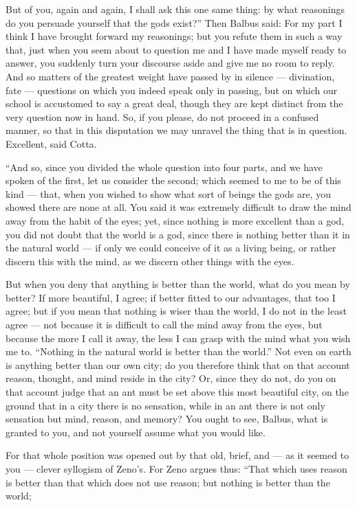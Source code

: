  But of you, again and again, I shall ask this one same thing: by what reasonings do you persuade yourself that the gods exist?'' Then Balbus said: For my part I think I have brought forward my reasonings; but you refute them in such a way that, just when you seem about to question me and I have made myself ready to answer, you suddenly turn your discourse aside and give me no room to reply. And so matters of the greatest weight have passed by in silence — divination, fate — questions on which you indeed speak only in passing, but on which our school is accustomed to say a great deal, though they are kept distinct from the very question now in hand. So, if you please, do not proceed in a confused manner, so that in this disputation we may unravel the thing that is in question. Excellent, said Cotta.

 ``And so, since you divided the whole question into four parts, and we have spoken of the first, let us consider the second; which seemed to me to be of this kind — that, when you wished to show what sort of beings the gods are, you showed there are none at all. You said it was extremely difficult to draw the mind away from the habit of the eyes; yet, since nothing is more excellent than a god, you did not doubt that the world is a god, since there is nothing better than it in the natural world — if only we could conceive of it as a living being, or rather discern this with the mind, as we discern other things with the eyes.

 But when you deny that anything is better than the world, what do you mean by better? If more beautiful, I agree; if better fitted to our advantages, that too I agree; but if you mean that nothing is wiser than the world, I do not in the least agree — not because it is difficult to call the mind away from the eyes, but because the more I call it away, the less I can grasp with the mind what you wish me to. ``Nothing in the natural world is better than the world.'' Not even on earth is anything better than our own city; do you therefore think that on that account reason, thought, and mind reside in the city? Or, since they do not, do you on that account judge that an ant must be set above this most beautiful city, on the ground that in a city there is no sensation, while in an ant there is not only sensation but mind, reason, and memory? You ought to see, Balbus, what is granted to you, and not yourself assume what you would like.

 For that whole position was opened out by that old, brief, and — as it seemed to you — clever syllogism of Zeno's. For Zeno argues thus: ``That which uses reason is better than that which does not use reason; but nothing is better than the world;

